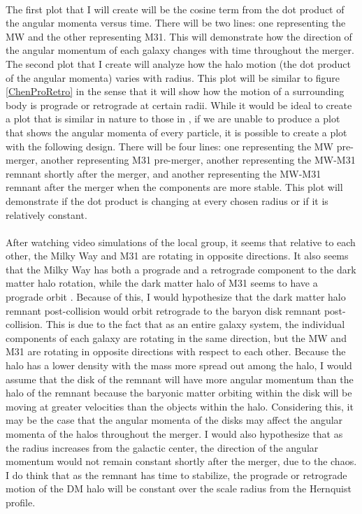 \documentclass[fleqn,usenatbib]{mnras}
\begin{document}
\paragraph{} The first plot that I will create will be the cosine term from the dot product of the angular momenta versus time. There will be two lines: one representing the MW and the other representing M31. This will demonstrate how the direction of the angular momentum of each galaxy changes with time throughout the merger. The second plot that I create will analyze how the halo motion (the dot product of the angular momenta) varies with radius. This plot will be similar to figure \ref{ChenProRetro} in the sense that it will show how the motion of a surrounding body is prograde or retrograde at certain radii. While it would be ideal to create a plot that is similar in nature to those in \citep{Chen+2022}, if we are unable to produce a plot that shows the angular momenta of every particle, it is possible to create a plot with the following design. There will be four lines: one representing the MW pre-merger, another representing M31 pre-merger, another representing the MW-M31 remnant shortly after the merger, and another representing the MW-M31 remnant after the merger when the components are more stable. This plot will demonstrate if the dot product is changing at every chosen radius or if it is relatively constant.

\paragraph{} After watching video simulations of the local group, it seems that relative to each other, the Milky Way and M31 are rotating in opposite directions. It also seems that the Milky Way has both a prograde and a retrograde component to the dark matter halo rotation, while the dark matter halo of M31 seems to have a prograde orbit \citep{Deason+2011}. Because of this, I would hypothesize that the dark matter halo remnant post-collision would orbit retrograde to the baryon disk remnant post-collision. This is due to the fact that as an entire galaxy system, the individual components of each galaxy are rotating in the same direction, but the MW and M31 are rotating in opposite directions with respect to each other. Because the halo has a lower density with the mass more spread out among the halo, I would assume that the disk of the remnant will have more angular momentum than the halo of the remnant because the baryonic matter orbiting within the disk will be moving at greater velocities than the objects within the halo. Considering this, it may be the case that the angular momenta of the disks may affect the angular momenta of the halos throughout the merger. I would also hypothesize that as the radius increases from the galactic center, the direction of the angular momentum would not remain constant shortly after the merger, due to the chaos. I do think that as the remnant has time to stabilize, the prograde or retrograde motion of the DM halo will be constant over the scale radius from the Hernquist profile. 
\end{document}
